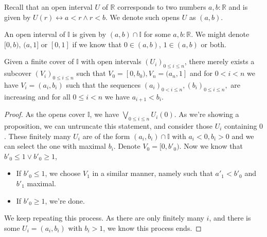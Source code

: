 \begin{definition}
  Recall that an open interval $U$ of $\mathbb R$ corresponds to two numbers
  $a,b:\mathbb R$ and is given by $U(r)\leftrightarrow a<r \wedge r < b$. 
  We denote such opens $U$ as $(a,b)$. 

  An open interval of $\mathbb I$ is given by $(a,b) \cap \mathbb I$ for some $a,b:\mathbb R$. 
  We might denote $[0,b)$, $(a,1]$ or $[0,1]$ if we know that $0\in (a,b)$, $1\in (a,b)$ or both. 
\end{definition}

\begin{lemma}\label{niceIntervalCover}
  Given a finite cover  of $\mathbb I$ with open intervals $(U_i)_{0\leq i \leq n}$, 
  there merely exists a subcover $(V_i)_{0\leq i \leq n}$ 
  such that $V_0 = [0,b_0), V_n = (a_n, 1]$ and for $0<i<n$ we have $V_i = (a_i, b_i)$ 
  such that the sequences 
  $
  (a_i)_{0<i\leq n} , (b_i)_{0\leq i \leq n}, 
  $
  are increasing and for all $0\leq i < n$ we have 
  $a_{i+1}<b_i$. 
  \\
\end{lemma}
\begin{proof}
  As the opens cover $\mathbb I$, we have $\bigvee_{0\leq i \leq n} U_i(0)$. 
  As we're showing a proposition, we can untruncate this statement, 
  and consider those $U_i$ containing $0$. 
  These finitely many $U_i$ are of the form $(a_i,b_i)\cap \mathbb I$ with $a_i<0, b_i>0$ 
  and we can select the one with maximal $b_i$. 
  Denote $V_0 = [0,b'_0)$. 
  Now we know that $b'_0\leq 1 \vee b'_0\geq 1$, 
  \begin{itemize}
    \item If $b'_0\leq 1$, we choose $V_1$ in a similar manner, namely such that $a'_1<b'_0$ and $b'_1$ maximal. 
    \item If $b'_0 \geq 1$, we're done. 
  \end{itemize}
  We keep repeating this process. 
  As there are only finitely many $i$, and there is some $U_i = (a_i, b_i)$ with $b_i>1$, we know this process ends. 
\end{proof}
